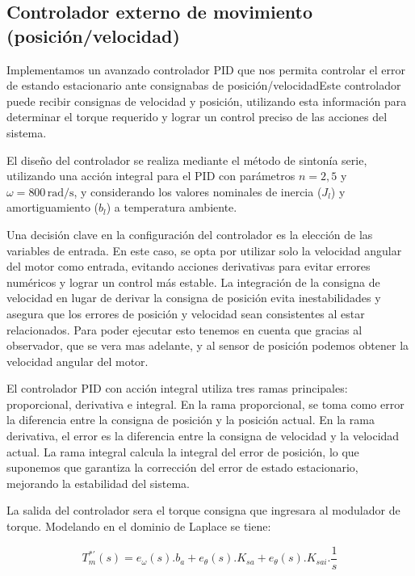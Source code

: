 \documentclass{article}
\begin{document}

\subsection{Controlador externo de movimiento (posición/velocidad)}

Implementamos un avanzado controlador PID que nos permita controlar el error de estando estacionario
ante consignabas de posición/velocidadEste controlador puede recibir consignas de 
velocidad y posición, utilizando esta información para determinar el torque requerido y lograr un control 
preciso de las acciones del sistema.

El diseño del controlador se realiza mediante el método de sintonía serie, utilizando una acción integral 
para el PID con parámetros $n=2,5$ y $\omega=800 \, \text{rad/s}$, y considerando los valores nominales de 
inercia ($J_l$) y amortiguamiento ($b_l$) a temperatura ambiente.

Una decisión clave en la configuración del controlador es la elección de las variables de entrada. En este 
caso, se opta por utilizar solo la velocidad angular del motor como entrada, evitando acciones derivativas 
para evitar errores numéricos y lograr un control más estable. La integración de la consigna de velocidad 
en lugar de derivar la consigna de posición evita inestabilidades y asegura que los errores de posición y 
velocidad sean consistentes al estar relacionados. Para poder ejecutar esto tenemos en cuenta que gracias 
al observador, que se vera mas adelante, y al sensor de posición podemos obtener la velocidad angular del motor. 

El controlador PID con acción integral utiliza tres ramas principales: proporcional, derivativa e integral. 
En la rama proporcional, se toma como error la diferencia entre la consigna de posición y la posición actual.
En la rama derivativa, el error es la diferencia entre la consigna de velocidad y la velocidad actual. La 
rama integral calcula la integral del error de posición, lo que suponemos que garantiza la corrección del 
error de estado estacionario, mejorando la estabilidad del sistema.

La salida del controlador sera el torque consigna que ingresara al modulador de torque. Modelando en el 
dominio de Laplace se tiene:

\begin{equation}\label{eq.controlador_error}
    T_m^{*\prime}(s) = e_\omega(s).b_a + e_\theta(s).K_{sa} + e_\theta(s).K_{sai}.\frac{1}{s}
\end{equation}
\end{document}
